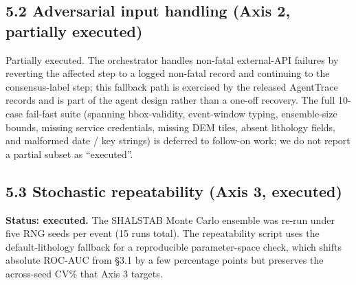 \documentclass[11pt,a4paper]{article}
\begin{document}
\subsection{5.2 Adversarial input handling (Axis 2, partially executed)}\label{adversarial-input-handling-axis-2-partially-executed}

Partially executed. The orchestrator handles non-fatal external-API failures by reverting the affected step to a logged non-fatal record and continuing to the consensus-label step; this fallback path is exercised by the released AgentTrace records and is part of the agent design rather than a one-off recovery. The full 10-case fail-fast suite (spanning bbox-validity, event-window typing, ensemble-size bounds, missing service credentials, missing DEM tiles, absent lithology fields, and malformed date / key strings) is deferred to follow-on work; we do not report a partial subset as ``executed''.

\subsection{\texorpdfstring{5.3 Stochastic repeatability (Axis 3, \textbf{executed})}{5.3 Stochastic repeatability (Axis 3, executed)}}\label{stochastic-repeatability-axis-3-executed}

\textbf{Status: executed.} The SHALSTAB Monte Carlo ensemble was re-run under five RNG seeds per event (15 runs total). The repeatability script uses the default-lithology fallback for a reproducible parameter-space check, which shifts absolute ROC-AUC from §3.1 by a few percentage points but preserves the across-seed CV\% that Axis 3 targets.
\end{document}
